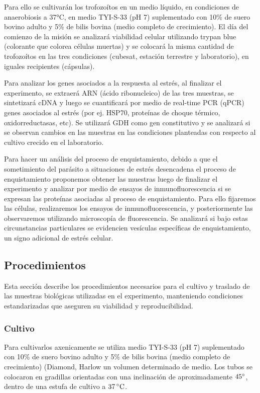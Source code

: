     Para ello se cultivarán los trofozoítos en un medio líquido, en condiciones de anaerobiosis a 37°C, en medio
    TYI-S-33 (pH 7) suplementado con 10\% de suero bovino adulto y 5\% de bilis bovina (medio completo de crecimiento).
    El día del comienzo de la misión se analizará viabilidad celular utilizando trypan blue (colorante que colorea
    células muertas) y se colocará la misma cantidad de trofozoítos en las tres condiciones (cubesat, estación
    terrestre y laboratorio), en iguales recipientes (cápsulas).

    Para analizar los genes asociados a la respuesta al estrés, al finalizar el experimento, se extraerá ARN (ácido
    ribonucleico) de las tres muestras, se sintetizará cDNA y luego se cuantificará por medio de real-time PCR (qPCR)
    genes asociados al estrés (por ej. HSP70, proteínas de choque térmico, oxidorreductasas, etc). Se utilizará GDH
    como gen constitutivo y se analizará si se observan cambios en las muestras en las condiciones planteadas con
    respecto al cultivo crecido en el laboratorio.

    Para hacer un análisis del proceso de enquistamiento, debido a que el sometimiento del parásito a situaciones de
    estrés desencadena el proceso de enquistamiento proponemos obtener las muestras luego de finalizar el experimento
    y analizar por medio de ensayos de inmunofluorescencia si se expresan las proteínas asociadas al proceso de
    enquistamiento. Para ello fijaremos las células, realizaremos los ensayos de inmunofluorescencia, y posteriormente
    las observaremos utilizando microscopía de fluorescencia. Se analizará si bajo estas circunstancias particulares se
    evidencien vesículas específicas de enquistamiento, un signo adicional de estrés celular.

  \subsection{Procedimientos}
    Esta sección describe los procedimientos necesarios para el cultivo y traslado de las muestras
    biológicas utilizadas en el experimento, manteniendo condiciones estandarizadas que
    aseguren su viabilidad y reproducibilidad.

    \subsubsection{Cultivo}
    Para cultivarlos axenicamente se utiliza medio TYI-S-33 (pH 7) suplementado con 10\% de
    suero bovino adulto y 5\% de bilis bovina (medio completo de crecimiento) (Diamond, Harlow
    un volumen determinado de medio. Los tubos se colocaron en gradillas orientadas con una
    inclinación de aproximadamente $45^{\circ}$, dentro de una estufa de cultivo a $37 \,^\circ\mathrm{C}$.

